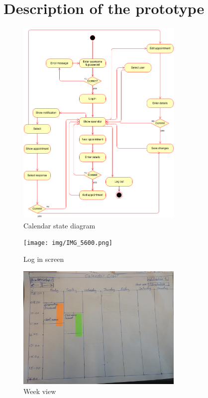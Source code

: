 \documentclass{article}
\begin{document}




\section{Description of the prototype}
\begin{figure}[h!] 
    \begin{center} 
        \includegraphics[width=8cm]{img/calendarStateDiagram.png}
        \caption{Calendar state diagram}
    \label{calendarstatediagram}
    \end{center}
\end{figure}

\begin{figure}[h!] 
    \begin{center} 
        \texttt{[image: img/IMG\_5600.png]}
        \caption{Log in screen}
    \label{login}
    \end{center}
\end{figure}

\begin{figure}[h!] 
    \begin{center} 
        \includegraphics[width=8cm]{img/IMG_5601.JPG}
        \caption{Week view}
    \label{weekview}
    \end{center}
\end{figure}
\end{document}
